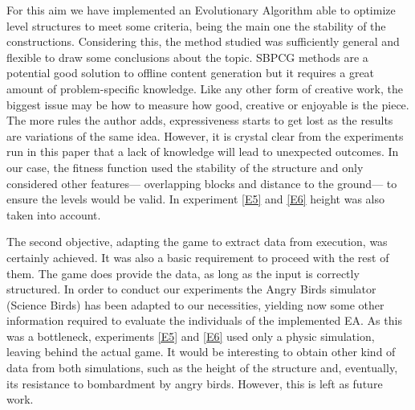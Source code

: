 \documentclass[runningheads,a4paper]{llncs}
\begin{document}
For this aim we have implemented an Evolutionary Algorithm able to optimize 
level structures to meet some criteria, being the main one the stability of the 
constructions.
Considering this, the method studied was
sufficiently general and flexible to draw some conclusions about the
topic. SBPCG methods are a potential good solution to offline content
generation but it requires a great amount of problem-specific
knowledge. Like any other form of creative work, the biggest issue may
be how to measure how good, creative or enjoyable is the piece. The
more rules the author adds, expressiveness starts to get lost as the
results are variations of the same idea. However, it is crystal clear
from the experiments run in this paper that a lack of knowledge
will lead to unexpected outcomes.
In our case, the fitness function used the 
stability of the structure and only considered other features--- overlapping 
blocks and distance to the ground--- to ensure the levels would be valid.
In experiment \ref{E5} and \ref{E6} height was also taken into account.


The second objective, adapting the game to extract data from execution, was 
certainly achieved. It was also a basic requirement to proceed with the rest of 
them. The game does provide the data, as long as the input is correctly 
structured. 
In order to conduct our experiments the Angry Birds simulator (Science Birds) 
has been adapted to our necessities, yielding now some  other information 
required to evaluate the individuals of the implemented EA. As this was a 
bottleneck, experiments \ref{E5} and \ref{E6} used only a physic simulation,
leaving behind the actual game.
It would be interesting to obtain other kind of data from both simulations,
such as the height of the structure and, eventually, its resistance to
bombardment by angry birds. However, this is left as future work.
\end{document}
